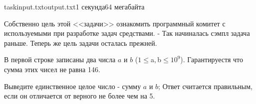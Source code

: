 \begin{problem}{task}{input.txt}{output.txt}{1 секунда}{64 мегабайта}


Собственно цель этой <<задачи>> ознакомить программный комитет с
используемыми при разработке задач средствами. - Так начиналась сэмпл задача раньше.
Теперь же цель задачи осталась прежней.

\InputFile

В первой строке записаны два числа $a$ и $b$ ($1 \leqslant $a$, $b$ \leqslant 10^9$).
Гарантируестя что сумма этих чисел не равна 146.

\OutputFile

Выведите единственное целое число - сумму $a$ и $b$;
Ответ считается правильным, если он отличается от верного не более чем на 5.

\Example
\begin{example}
%
\end{example}

\end{problem}
